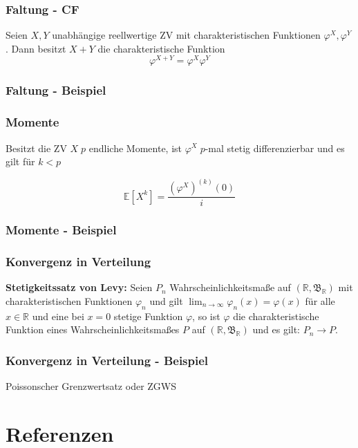 \documentclass{beamer}
\newcommand{\R}{\mathbb{R}}
\newcommand{\E}{\mathbb{E}}
\begin{document}
\begin{frame}
\frametitle{Faltung - CF}
  Seien $X, Y$ unabhängige reellwertige ZV mit charakteristischen Funktionen $\varphi^X, \varphi^Y$. Dann besitzt $X + Y$ die charakteristische Funktion
$$\varphi^{X+Y} = \varphi^X \varphi^Y$$
\end{frame}

\begin{frame}
\frametitle{Faltung - Beispiel}

\end{frame}

\begin{frame}
\frametitle{Momente}
Besitzt die ZV $X \; p$ endliche Momente, ist $\varphi^X \; p$-mal stetig differenzierbar und es gilt für $k < p$

\begin{equation*}
\E[X^k] = \frac{(\varphi^X)^{(k)}(0)}{i}
\end{equation*}
\end{frame}

\begin{frame}
\frametitle{Momente - Beispiel}
\end{frame}

\begin{frame}
\frametitle{Konvergenz in Verteilung}
\textbf{Stetigkeitssatz von Levy:} \hfill \newline
Seien $P_n$ Wahrscheinlichkeitsmaße auf $(\R, \mathfrak{B}_\R)$ mit charakteristischen Funktionen $\varphi_n$ und gilt $\lim_{n \to \infty} \varphi_n (x) = \varphi(x)$ für alle $x \in \R$ und eine bei $x = 0$ stetige Funktion $\varphi$, so ist $\varphi$ die charakteristische Funktion eines Wahrscheinlichkeitsmaßes $P$ auf $(\R, \mathfrak{B}_\R)$ und es gilt: $P_n \to P$.
\end{frame}

\begin{frame}
\frametitle{Konvergenz in Verteilung - Beispiel}
Poissonscher Grenzwertsatz oder ZGWS
\end{frame}

\begin{frame}
\frametitle{}
\end{frame}


\section*{Referenzen}

\end{document}
